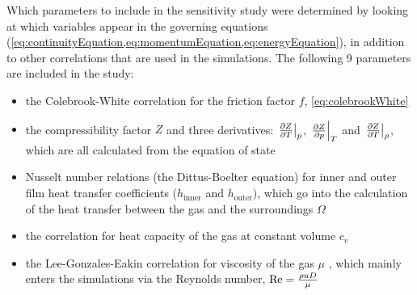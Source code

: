 Which parameters to include in the sensitivity study were determined by looking at which variables appear in the governing equations (\cref{eq:continuityEquation,eq:momentumEquation,eq:energyEquation}), in addition to other correlations that are used in the simulations. The following 9 parameters are included in the study:
\begin{itemize}
    \item the Colebrook-White correlation for the friction factor $f$, \cref{eq:colebrookWhite}
    
    \item the compressibility factor $Z$ and three derivatives: $\eval{\pd{Z}{T}}_p$, $\eval{\pd{Z}{p}}_T$ and $\eval{\pd{Z}{T}}_\rho$, which are all calculated from the equation of state
    
    \item Nusselt number relations (the Dittus-Boelter equation) for inner and outer film heat transfer coefficients ($h_\text{inner}$ and $h_\text{outer}$), which go into the calculation of the heat transfer between the gas and the surroundings $\Omega$
    
    \item the correlation for heat capacity of the gas at constant volume %
    $c_v$
    
    \item the Lee-Gonzales-Eakin correlation for viscosity of the gas $\mu$ \cite{Lee1966Viscosity}, which mainly enters the simulations via the Reynolds number, $\operatorname{R\kern-.04em e} = \frac{\rho u D}{\mu}$
 \end{itemize}



